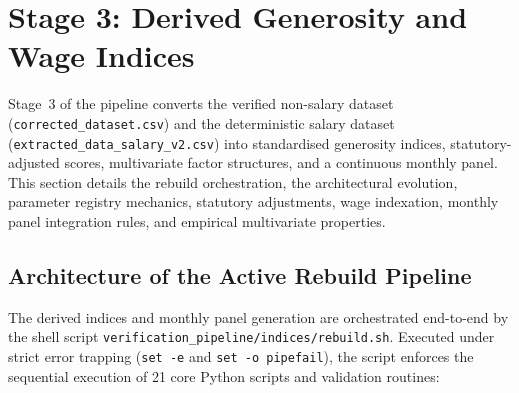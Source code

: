 \section{Stage 3: Derived Generosity and Wage Indices}
\label{sec:indices}

Stage~3 of the pipeline converts the verified non-salary dataset (\nolinkurl{corrected_dataset.csv}) and the deterministic salary dataset (\nolinkurl{extracted_data_salary_v2.csv}) into standardised generosity indices, statutory-adjusted scores, multivariate factor structures, and a continuous monthly panel. This section details the rebuild orchestration, the architectural evolution, parameter registry mechanics, statutory adjustments, wage indexation, monthly panel integration rules, and empirical multivariate properties.

\subsection{Architecture of the Active Rebuild Pipeline}
\label{sec:indices_rebuild}

The derived indices and monthly panel generation are orchestrated end-to-end by the shell script \nolinkurl{verification_pipeline/indices/rebuild.sh}. Executed under strict error trapping (\texttt{set -e} and \texttt{set -o pipefail}), the script enforces the sequential execution of 21 core Python scripts and validation routines:

